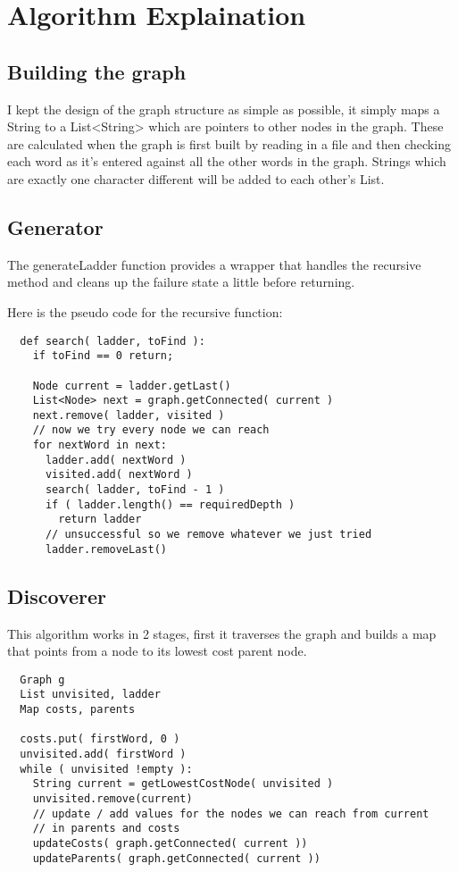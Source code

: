 \documentclass[12pt, titlepage, a4paper, oneside]{article}
\begin{document}
\section*{Algorithm Explaination}

\subsection*{Building the graph}
I kept the design of the graph structure as simple as possible, it simply maps
a String to a List<String> which are pointers to other nodes in the graph. These
are calculated when the graph is first built by reading in a file and then checking
each word as it's entered against all the other words in the graph. Strings which
are exactly one character different will be added to each other's List.

\subsection*{Generator}
The generateLadder function provides a wrapper that handles the recursive method
and cleans up the failure state a little before returning.

Here is the pseudo code for the recursive function:
\begin{verbatim}
  def search( ladder, toFind ):
    if toFind == 0 return;

    Node current = ladder.getLast()
    List<Node> next = graph.getConnected( current )
    next.remove( ladder, visited )
    // now we try every node we can reach
    for nextWord in next:
      ladder.add( nextWord )
      visited.add( nextWord )
      search( ladder, toFind - 1 )
      if ( ladder.length() == requiredDepth )
        return ladder
      // unsuccessful so we remove whatever we just tried
      ladder.removeLast() 
\end{verbatim}

\subsection*{Discoverer}
This algorithm works in 2 stages, first it traverses the graph and builds a map
that points from a node to its lowest cost parent node.
\begin{verbatim}
  Graph g
  List unvisited, ladder
  Map costs, parents

  costs.put( firstWord, 0 )
  unvisited.add( firstWord )
  while ( unvisited !empty ):
    String current = getLowestCostNode( unvisited )
    unvisited.remove(current)
    // update / add values for the nodes we can reach from current
    // in parents and costs
    updateCosts( graph.getConnected( current ))
    updateParents( graph.getConnected( current ))
\end{verbatim}
\end{document}
